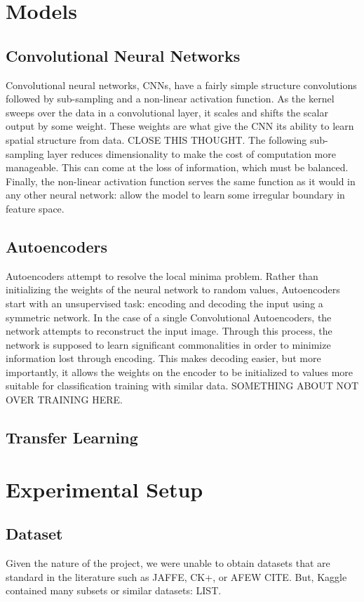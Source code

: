 \documentclass[conference]{IEEEtran}
\begin{document}
\section{Models}
\subsection{Convolutional Neural Networks}
Convolutional neural networks, CNNs, have a fairly simple structure convolutions followed by sub-sampling and a non-linear activation function. As the kernel sweeps over the data in a convolutional layer, it scales and shifts the scalar output by some weight. These weights are what give the CNN its ability to learn spatial structure from data. CLOSE THIS THOUGHT. The following sub-sampling layer reduces dimensionality to make the cost of computation more manageable. This can come at the loss of information, which must be balanced. Finally, the non-linear activation function serves the same function as it would in any other neural network: allow the model to learn some irregular boundary in feature space. 

\subsection{Autoencoders}
Autoencoders attempt to resolve the local minima problem. Rather than initializing the weights of the neural network to random values, Autoencoders start with an unsupervised task: encoding and decoding the input using a symmetric network. In the case of a single Convolutional Autoencoders, the network attempts to reconstruct the input image. Through this process, the network is supposed to learn significant commonalities in order to minimize information lost through encoding. This makes decoding easier, but more importantly, it allows the weights on the encoder to be initialized to values more suitable for classification training with similar data. SOMETHING ABOUT NOT OVER TRAINING HERE.

\subsection{Transfer Learning}

\section{Experimental Setup}
\subsection{Dataset}
Given the nature of the project, we were unable to obtain datasets that are standard in the literature such as JAFFE, CK+, or AFEW CITE. But, Kaggle contained many subsets or similar datasets: LIST. 
\end{document}
